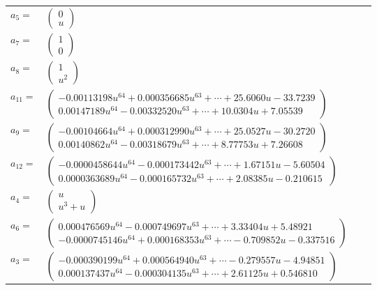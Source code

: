 \documentclass[1p]{elsarticle_modified}
\theoremstyle{definition}
\begin{document}
\begin{tabular}{m{7pt} m{180pt} m{7pt} m{180pt} }
\flushright $a_{5}=$&$\begin{pmatrix}0\\u\end{pmatrix}$ \\
\flushright $a_{7}=$&$\begin{pmatrix}1\\0\end{pmatrix}$ \\
\flushright $a_{8}=$&$\begin{pmatrix}1\\u^2\end{pmatrix}$ \\
\flushright $a_{11}=$&$\begin{pmatrix}-0.00113198 u^{64}+0.000356685 u^{63}+\cdots+25.6060 u-33.7239\\0.00147189 u^{64}-0.00332520 u^{63}+\cdots+10.0304 u+7.05539\end{pmatrix}$ \\
\flushright $a_{9}=$&$\begin{pmatrix}-0.00104664 u^{64}+0.000312990 u^{63}+\cdots+25.0527 u-30.2720\\0.00140862 u^{64}-0.00318679 u^{63}+\cdots+8.77753 u+7.26608\end{pmatrix}$ \\
\flushright $a_{12}=$&$\begin{pmatrix}-0.0000458644 u^{64}-0.000173442 u^{63}+\cdots+1.67151 u-5.60504\\0.0000363689 u^{64}-0.000165732 u^{63}+\cdots+2.08385 u-0.210615\end{pmatrix}$ \\
\flushright $a_{4}=$&$\begin{pmatrix}u\\u^3+u\end{pmatrix}$ \\
\flushright $a_{6}=$&$\begin{pmatrix}0.000476569 u^{64}-0.000749697 u^{63}+\cdots+3.33404 u+5.48921\\-0.0000745146 u^{64}+0.000168353 u^{63}+\cdots-0.709852 u-0.337516\end{pmatrix}$ \\
\flushright $a_{3}=$&$\begin{pmatrix}-0.000390199 u^{64}+0.000564940 u^{63}+\cdots-0.279557 u-4.94851\\0.000137437 u^{64}-0.000304135 u^{63}+\cdots+2.61125 u+0.546810\end{pmatrix}$ \\

\end{tabular}
\end{document}
